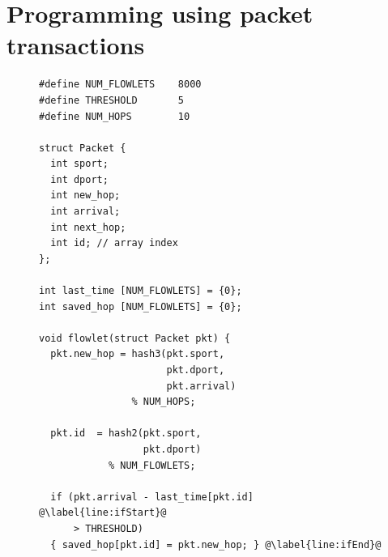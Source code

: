
\section{Programming using packet transactions}
\label{s:transactions}

\begin{figure}[!t]
\begin{minipage}{0.5\textwidth}
\begin{small}
\begin{lstlisting}[style=customc]
#define NUM_FLOWLETS    8000
#define THRESHOLD       5
#define NUM_HOPS        10

struct Packet {
  int sport;
  int dport;
  int new_hop;
  int arrival;
  int next_hop;
  int id; // array index
};

int last_time [NUM_FLOWLETS] = {0};
int saved_hop [NUM_FLOWLETS] = {0};

void flowlet(struct Packet pkt) {
  pkt.new_hop = hash3(pkt.sport,
                      pkt.dport,
                      pkt.arrival)
                % NUM_HOPS;

  pkt.id  = hash2(pkt.sport,
                  pkt.dport)
            % NUM_FLOWLETS;

  if (pkt.arrival - last_time[pkt.id] @\label{line:ifStart}@
      > THRESHOLD)
  { saved_hop[pkt.id] = pkt.new_hop; } @\label{line:ifEnd}@


\end{lstlisting}
\end{small}
\end{minipage}
\end{figure}
